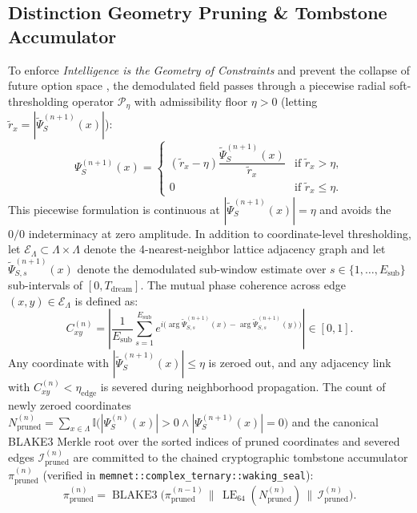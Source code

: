 \documentclass[10pt, twocolumn, a4paper]{article}
\begin{document}
\subsection{Distinction Geometry Pruning \& Tombstone Accumulator}
To enforce \textit{Intelligence is the Geometry of Constraints} \cite{guimond2026constraints} and prevent the collapse of future option space \cite{guimond2026collapse}, the demodulated field passes through a piecewise radial soft-thresholding operator $\mathcal{P}_{\eta}$ with admissibility floor $\eta > 0$ (letting $\tilde{r}_x = |\widetilde{\Psi}_S^{(n+1)}(x)|$):
\begin{equation}
\Psi_S^{(n+1)}(x) =
\begin{cases}
(\tilde{r}_x - \eta) \dfrac{\widetilde{\Psi}_S^{(n+1)}(x)}{\tilde{r}_x} & \text{if } \tilde{r}_x > \eta, \\[6pt]
0 & \text{if } \tilde{r}_x \le \eta.
\end{cases}
\label{eq:pruning}
\end{equation}
This piecewise formulation is continuous at $|\widetilde{\Psi}_S^{(n+1)}(x)| = \eta$ and avoids the $0/0$ indeterminacy at zero amplitude. In addition to coordinate-level thresholding, let $\mathcal{E}_{\Lambda} \subset \Lambda \times \Lambda$ denote the 4-nearest-neighbor lattice adjacency graph and let $\widetilde{\Psi}_{S,s}^{(n+1)}(x)$ denote the demodulated sub-window estimate over $s \in \{1, \dots, E_{\text{sub}}\}$ sub-intervals of $[0, T_{\text{dream}}]$. The mutual phase coherence across edge $(x, y) \in \mathcal{E}_{\Lambda}$ is defined as:
\begin{equation}
C_{xy}^{(n)} = \left| \frac{1}{E_{\text{sub}}} \sum_{s=1}^{E_{\text{sub}}} e^{i\big(\arg \widetilde{\Psi}_{S,s}^{(n+1)}(x) - \arg \widetilde{\Psi}_{S,s}^{(n+1)}(y)\big)} \right| \in [0, 1].
\label{eq:edge_coherence}
\end{equation}
Any coordinate with $|\widetilde{\Psi}_S^{(n+1)}(x)| \le \eta$ is zeroed out, and any adjacency link with $C_{xy}^{(n)} < \eta_{\text{edge}}$ is severed during neighborhood propagation. The count of newly zeroed coordinates $N_{\text{pruned}}^{(n)} = \sum_{x \in \Lambda} \mathbb{I}\big(|\Psi_S^{(n)}(x)| > 0 \land |\Psi_S^{(n+1)}(x)| = 0\big)$ and the canonical BLAKE3 Merkle root over the sorted indices of pruned coordinates and severed edges $\mathcal{I}_{\text{pruned}}^{(n)}$ are committed to the chained cryptographic tombstone accumulator $\pi_{\text{pruned}}^{(n)}$ (verified in \texttt{memnet::complex\_ternary::waking\_seal}):
\begin{equation}
\pi_{\text{pruned}}^{(n)} = \operatorname{BLAKE3}\!\big(\pi_{\text{pruned}}^{(n-1)} \,\|\, \operatorname{LE}_{64}(N_{\text{pruned}}^{(n)}) \,\|\, \mathcal{I}_{\text{pruned}}^{(n)}\big).
\label{eq:tombstone_chain}
\end{equation}
\end{document}

